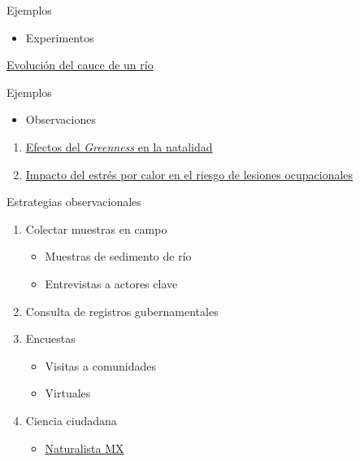 \documentclass[
  11pt,
  ignorenonframetext,
]{beamer}
\providecommand{\tightlist}{%
  \setlength{\itemsep}{0pt}\setlength{\parskip}{0pt}}
\begin{document}
\begin{frame}{Ejemplos}
\protect\hypertarget{ejemplos}{}
\begin{itemize}
\tightlist
\item
  Experimentos
\end{itemize}

\href{https://www.youtube.com/watch?v=BuIYh17daSs}{Evolución del cauce
de un río}
\end{frame}

\begin{frame}{Ejemplos}
\protect\hypertarget{ejemplos-1}{}
\begin{itemize}
\tightlist
\item
  Observaciones
\end{itemize}

\begin{enumerate}
\item
  \href{https://www.sciencedirect.com/science/article/abs/pii/S0013935120314961}{Efectos
  del \emph{Greenness} en la natalidad}
\item
  \href{https://onlinelibrary.wiley.com/doi/abs/10.1002/ajim.22946?casa_token=YsxyobqagVoAAAAA:wQw6Ys7vyJwmpNFknOv29Y88asNazOdFFxWnQ-gvo87DQ9sjU1wbOuPml275U9NDWdcze3fsDCGO0Vw}{Impacto
  del estrés por calor en el riesgo de lesiones ocupacionales}
\end{enumerate}
\end{frame}

\begin{frame}{Estrategias observacionales}
\protect\hypertarget{estrategias-observacionales}{}
\begin{enumerate}
\item
  Colectar muestras en campo

  \begin{itemize}
  \tightlist
  \item
    Muestras de sedimento de río
  \item
    Entrevistas a actores clave
  \end{itemize}
\item
  Consulta de registros gubernamentales
\item
  Encuestas

  \begin{itemize}
  \tightlist
  \item
    Visitas a comunidades
  \item
    Virtuales
  \end{itemize}
\item
  Ciencia ciudadana

  \begin{itemize}
  \tightlist
  \item
    \href{https://naturalista.mx}{Naturalista MX}
  \end{itemize}
\end{enumerate}
\end{frame}
\end{document}
